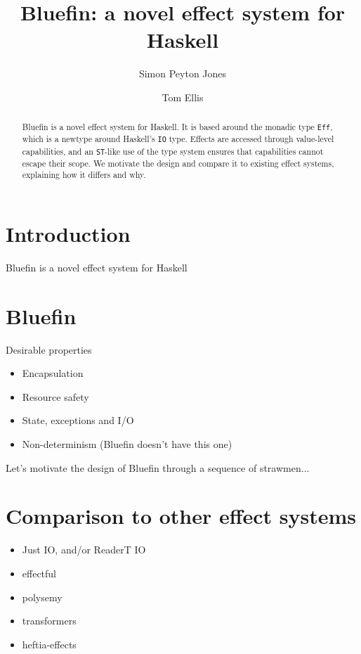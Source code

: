 \documentclass[sigplan,screen]{acmart}
\begin{document}
\title{Bluefin: a novel effect system for Haskell}

\author{Simon Peyton Jones}

\author{Tom Ellis}

\begin{abstract}
  Bluefin is a novel effect system for Haskell.  It is based around
  the monadic type \texttt{Eff}, which is a newtype around Haskell's
  \texttt{IO} type.  Effects are accessed through value-level
  capabilities, and an \texttt{ST}-like use of the type system ensures
  that capabilities cannot escape their scope.  We motivate the design
  and compare it to existing effect systems, explaining how it differs
  and why.
\end{abstract}

\maketitle

\section{Introduction}

Bluefin is a novel effect system for Haskell

\section{Bluefin}

Desirable properties

\begin{itemize}
\item Encapsulation
\item Resource safety
\item State, exceptions and I/O
\item Non-determinism (Bluefin doesn't have this one)
\end{itemize}

Let's motivate the design of Bluefin through a sequence of strawmen...

\section{Comparison to other effect systems}

\begin{itemize}
\item Just IO, and/or ReaderT IO
\item effectful
\item polysemy
\item transformers
\item heftia-effects
\end{itemize}
\end{document}
